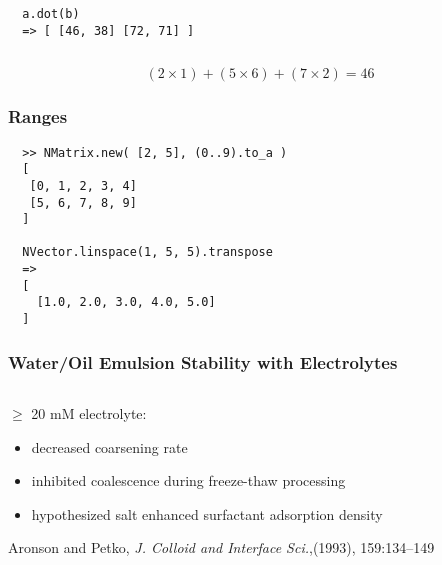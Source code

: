 \documentclass[10pt]{beamer}
\begin{document}
\begin{frame}[fragile]
\begin{columns}
\begin{column}{0.45\textwidth}
\begin{snugshade}
\begin{verbatim}
  a.dot(b)
  => [ [46, 38] [72, 71] ]
  \end{verbatim}
  \end{snugshade}

    \end{column}
  \end{columns}

  \vspace{5mm}
  \begin{snugshade}
  \[ (2 \times 1) + (5 \times 6) + (7 \times 2) = 46 \]
  \end{snugshade}
\end{frame}

\begin{frame}[fragile]
  \frametitle{Ranges}

  \begin{verbatim}
  >> NMatrix.new( [2, 5], (0..9).to_a )
  [
   [0, 1, 2, 3, 4]
   [5, 6, 7, 8, 9]
  ]

  NVector.linspace(1, 5, 5).transpose
  =>
  [
    [1.0, 2.0, 3.0, 4.0, 5.0]
  ]

  \end{verbatim}
\end{frame}


\begin{frame}
 \frametitle{Water/Oil Emulsion Stability with Electrolytes}
\begin{columns}

\begin{column}{0.5\textwidth}
$\geq$ 20 mM electrolyte: \\
\begin{itemize}
 \item decreased coarsening rate
\item inhibited coalescence during freeze-thaw processing
\item hypothesized salt enhanced surfactant adsorption density
\end{itemize}

\vspace{5mm}

Aronson and Petko, {\em J. Colloid and Interface Sci.},(1993), 159:134--149
 \end{column}

 \begin{column}{0.5\textwidth}
 \end{column}
\end{columns}

\end{frame}
\end{document}
